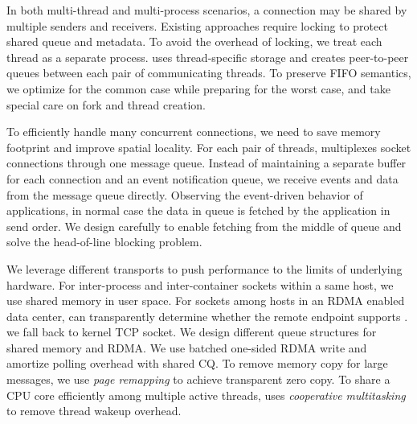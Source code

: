 In both multi-thread and multi-process scenarios, a connection may be shared by multiple senders and receivers.
Existing approaches require locking to protect shared queue and metadata.
To avoid the overhead of locking, we treat each thread as a separate process.
\libipc{} uses thread-specific storage and creates peer-to-peer queues between each pair of communicating threads.
To preserve FIFO semantics, we optimize for the common case while preparing for the worst case, and take special care on fork and thread creation.

To efficiently handle many concurrent connections, we need to save memory footprint and improve spatial locality.
For each pair of threads, \sys multiplexes socket connections through one message queue.
Instead of maintaining a separate buffer for each connection and an event notification queue, we receive events and data from the message queue directly.
Observing the event-driven behavior of applications, in normal case the data in queue is fetched by the application in send order.
We design carefully to enable fetching from the middle of queue and solve the head-of-line blocking problem.

We leverage different transports to push performance to the limits of underlying hardware.
For inter-process and inter-container sockets within a same host, we use shared memory in user space.
For sockets among hosts in an RDMA enabled data center, \sys can transparently determine whether the remote endpoint supports \sys.
we fall back to kernel TCP socket.
We design different queue structures for shared memory and RDMA.
We use batched one-sided RDMA write and amortize polling overhead with shared CQ.
To remove memory copy for large messages, we use \emph{page remapping} to achieve transparent zero copy.
To share a CPU core efficiently among multiple active threads, \sys uses \emph{cooperative multitasking} to remove thread wakeup overhead.

\fi


